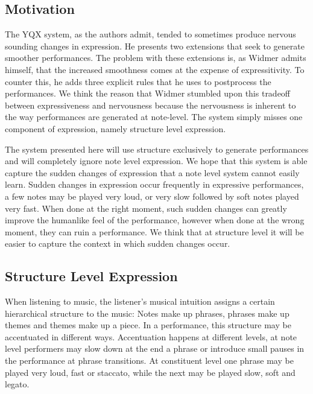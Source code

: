 \documentclass[a4paper,10pt]{article}
\begin{document}
\subsection{Motivation}

The YQX system, as the authors admit, tended to sometimes produce nervous sounding changes in expression. He presents two extensions that seek to generate smoother performances. The problem with these extensions is, as Widmer admits himself, that the increased smoothness comes at the expense of expressitivity. To counter this, he adds three explicit rules that he uses to postprocess the performances. We think the reason that Widmer stumbled upon this tradeoff between expressiveness and nervousness because the nervousness is inherent to the way performances are generated at note-level. The system simply misses one component of expression, namely structure level expression. 


The system presented here will use structure exclusively to generate performances and will completely ignore note level expression. We hope that this system is able capture the sudden changes of expression that a note level system cannot easily learn. Sudden changes in expression occur frequently in expressive performances, a few notes may be played very loud, or very slow followed by soft notes played very fast. When done at the right moment, such sudden changes can greatly improve the humanlike feel of the performance, however when done at the wrong moment, they can ruin a performance. We think that at structure level it will be easier to capture the context in which sudden changes occur. 




\subsection{Structure Level Expression}
When listening to music, the listener's musical intuition assigns a certain hierarchical structure to the music: Notes make up phrases, phrases make up themes and themes make up a piece. In a performance, this structure may be accentuated in different ways. Accentuation happens at different levels, at note level performers may slow down at the end a phrase or introduce small pauses in the performance at phrase transitions. At constituent level one phrase may be played very loud, fast or staccato, while the next may be played slow, soft and legato. 
\end{document}
